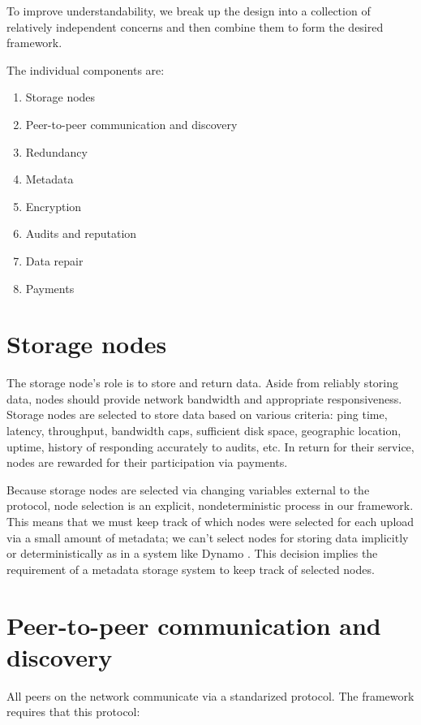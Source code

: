 \documentclass[11pt,fleqn,openany]{book}
\begin{document}
To improve understandability, we break up the design into a collection of
relatively independent concerns and then combine them to form the desired
framework.

The individual components are:

\begin{enumerate}
\item Storage nodes
\item Peer-to-peer communication and discovery
\item Redundancy
\item Metadata
\item Encryption
\item Audits and reputation
\item Data repair
\item Payments
\end{enumerate}

\section{Storage nodes}

The storage node's role is to store and return data.
Aside from reliably storing data, nodes should provide
network bandwidth and appropriate responsiveness.
Storage nodes are selected to store data based on various criteria: ping time,
latency, throughput, bandwidth caps, sufficient disk space,
geographic location, uptime, history of responding accurately to audits, etc.
In return for their service, nodes are rewarded for their participation via
payments.

Because storage
nodes are selected via changing variables external to the protocol, node
selection is an explicit, nondeterministic process in our framework. This means
that we must keep track of which nodes were selected for each upload via a
small amount of metadata; we can't select nodes for storing data implicitly or
deterministically as in a system like Dynamo \cite{dynamo}. This decision
implies the requirement of a metadata storage system to keep track
of selected nodes.

\section{Peer-to-peer communication and discovery}

All peers on the network communicate via a standarized protocol. The
framework requires that this protocol:
\end{document}
